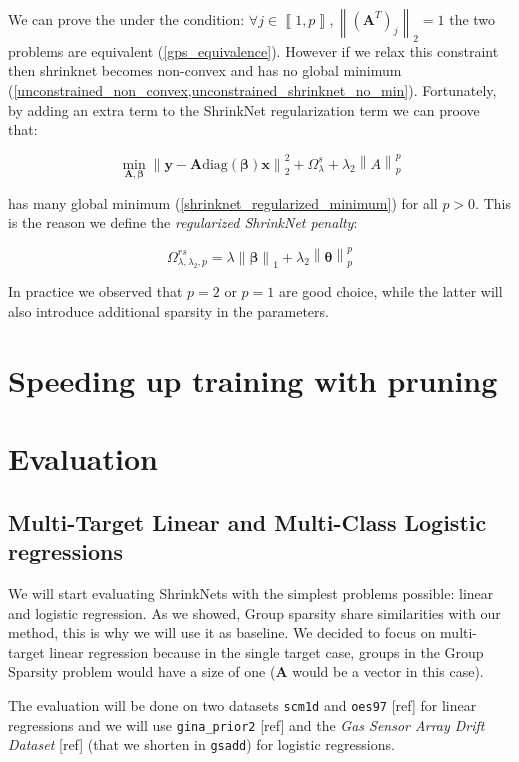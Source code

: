 \documentclass{article}
\newcommand{\norm}[1]{\left\lVert#1\right\rVert}
\newcommand{\diag}[1]{\text{diag}\left(#1\right)}
\newcommand{\intint}[1]{\left\llbracket#1\right\rrbracket}
\begin{document}
We can prove the under the condition: $\forall j\in \intint{1, p}, \norm{\left(\bm{A}^T\right)_j}_2 = 1$ the two problems are equivalent (\cref{gps_equivalence}). However if we relax this constraint then shrinknet becomes non-convex and has no global minimum (\cref{unconstrained_non_convex,unconstrained_shrinknet_no_min}). Fortunately, by adding an extra term to the ShrinkNet regularization term we can proove that:

\begin{equation}
  \min_{\bm{A}, \bm{\beta}} \norm{\bm{y} - \bm{A}\diag{\bm{\beta}}\bm{x}}_2^2 + \Omega_\lambda^s + \lambda_2\norm{A}_p^p
\end{equation}

has many global minimum (\cref{shrinknet_regularized_minimum}) for all $p>0$. This is the reason we define the \textit{regularized ShrinkNet penalty}:

\begin{equation}
  \Omega_{\lambda, \lambda_2, p}^{rs} = \lambda\norm{\bm{\beta}}_1 + \lambda_2\norm{\bm\theta}_p^p
\end{equation}

In practice we observed that $p=2$ or $p=1$ are good choice, while the latter will also introduce additional sparsity in the parameters.

\section{Speeding up training with pruning}

\section{Evaluation}

\subsection{Multi-Target Linear and Multi-Class Logistic regressions}

We will start evaluating ShrinkNets with the simplest problems possible: linear
and logistic regression. As we showed, Group sparsity share similarities with
our method, this is why we will use it as baseline. We decided to focus on
multi-target linear regression because in the single target case, groups in the
Group Sparsity problem would have a size of one ($\bm{A}$ would be a vector in this
case).

The evaluation will be done on two datasets \texttt{scm1d} and \texttt{oes97}
[ref] for linear regressions and we will use \texttt{gina\_prior2} [ref] and
the \textit{Gas Sensor Array Drift Dataset} [ref] (that we shorten in
\texttt{gsadd}) for logistic regressions.
\end{document}
